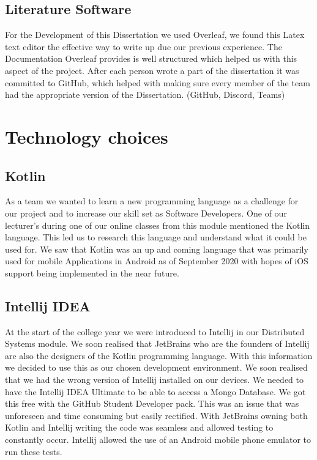 \subsection{Literature Software}
For the Development of this Dissertation we used Overleaf, we found this Latex text editor the effective way to write up due our previous experience. The Documentation Overleaf provides is well structured which helped us with this aspect of the project. After each person wrote a part of the dissertation it was committed to GitHub, which helped with making sure every member of the team had the appropriate version of the Dissertation.
(GitHub, Discord, Teams)
\section{Technology choices}
\subsection{Kotlin}
As a team we wanted to learn a new programming language as a challenge for our project and to increase our skill set as Software Developers. One of our lecturer's during one of our online classes from this module mentioned the Kotlin language. This led us to research this language and understand what it could be used for. We saw that Kotlin was an up and coming language that was primarily used for mobile Applications in Android as of September 2020 with hopes of iOS support being implemented in the near future.
\subsection{Intellij IDEA}
At the start of the college year we were introduced to Intellij in our Distributed Systems module. We soon realised that JetBrains who are the founders of Intellij are also the designers of the Kotlin programming language. With this information we decided to use this as our chosen development environment.
\newline
We soon realised that we had the wrong version of Intellij installed on our devices. We needed to have the Intellij IDEA Ultimate to be able to access a Mongo Database. We got this free with the GitHub Student Developer pack. This was an issue that was unforeseen and time consuming but easily rectified.
\newline 
With JetBrains owning both Kotlin and Intellij writing the code was seamless and allowed testing to constantly occur. Intellij allowed the use of an Android mobile phone emulator to run these tests.
